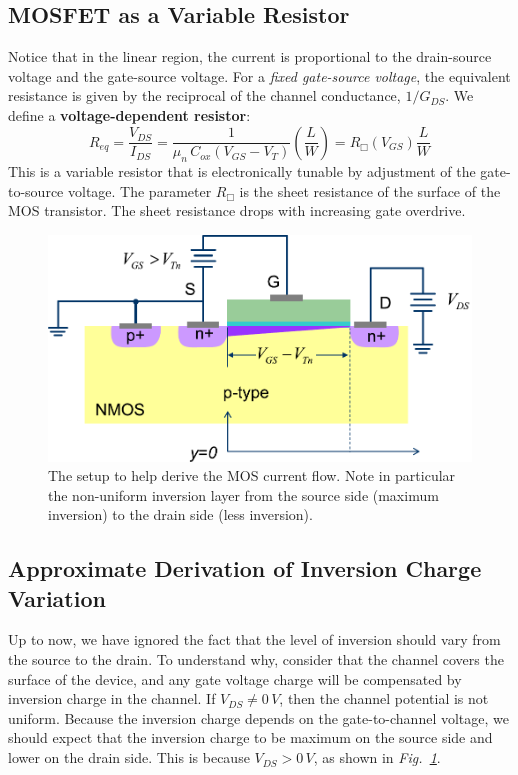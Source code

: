 \subsection{MOSFET as a Variable Resistor}
Notice that in the linear region, the current is proportional to the drain-source voltage and the gate-source voltage.  For a \textit{fixed gate-source voltage}, the equivalent resistance is given by the reciprocal of the channel conductance, $1/G_{DS}$.  We define a \textbf{voltage-dependent resistor}:
    \begin{equation}
        R_{eq} = \frac{V_{DS}}{I_{DS}} = \frac{1}{\mu_n\,C_{ox}(V_{GS} - V_T)} \left( {\frac{L}{W}} \right)
        = R_\Box(V_{GS})\frac{L}{W}
    \end{equation}
This is a variable resistor that is electronically tunable by adjustment of the gate-to-source voltage.  The parameter $R_\Box$ is the sheet resistance of the surface of the MOS transistor.  The sheet resistance drops with increasing gate overdrive.
\newpage
\begin{figure}[t]
\centering
\includegraphics[width=.85\columnwidth]{mos_current_derive}
\caption{The setup to help derive the MOS current flow.  Note in particular the non-uniform inversion layer from the source side (maximum inversion) to the drain side (less inversion).}
\label{fig:mos_current_derive}
\end{figure}
\subsection{Approximate Derivation of Inversion Charge Variation}
Up to now, we have ignored the fact that the level of inversion should vary from the source to the drain.  To understand why, consider that the channel covers the surface of the device, and any gate voltage charge will be compensated by inversion charge in the channel.  If $V_{DS} \ne 0\,V$, then the channel potential is not uniform. Because the inversion charge depends on the gate-to-channel voltage, we should expect that the inversion charge to be maximum on the source side and lower on the drain side.  This is because $V_{DS} > 0\,V$, as shown in \emph{Fig.~\ref{fig:mos_current_derive}}.

